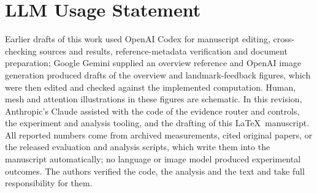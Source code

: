 \section*{LLM Usage Statement}
\label{sec:llm}

Earlier drafts of this work used OpenAI Codex for manuscript editing, cross-checking sources and results, reference-metadata verification and document preparation; Google Gemini supplied an overview reference and OpenAI image generation produced drafts of the overview and landmark-feedback figures, which were then edited and checked against the implemented computation.
Human, mesh and attention illustrations in these figures are schematic.
In this revision, Anthropic's Claude assisted with the code of the evidence router and controls, the experiment and analysis tooling, and the drafting of this \LaTeX\ manuscript.
All reported numbers come from archived measurements, cited original papers, or the released evaluation and analysis scripts, which write them into the manuscript automatically; no language or image model produced experimental outcomes.
The authors verified the code, the analysis and the text and take full responsibility for them.
